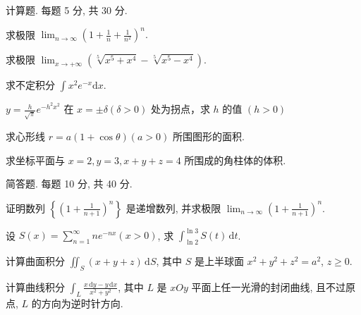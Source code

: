 \par{}
计算题. 每题 5 分, 共 30 分.\par
求极限 $\lim_{n\to \infty}\left(1 + \frac{1}{n} +\frac{1}{n^2}\right)^n.$\par
求极限 $\lim_{x\to +\infty}\left(\sqrt[5]{x^5 + x^4} -\sqrt[5]{x^5 - x^4}\right).$\par
求不定积分 $\int x^{2}e^{-x}\mathrm{d}x.$\par
$y = \frac{h}{\sqrt{\pi}} e^{-h^2 x^2}$ 在 $x = \pm \delta (\delta >0)$ 处为拐点，求 $h$ 的值 $(h > 0)$\par
求心形线 $r = a(1 + \cos \theta) (a > 0)$ 所围图形的面积.\par
求坐标平面与 $x = 2, y = 3, x + y + z = 4$ 所围成的角柱体的体积.\par
\par{}
简答题. 每题 10 分, 共 40 分.\par
证明数列 $\left\{\left(1 + \frac{1}{n + 1}\right)^n\right\}$ 是递增数列, 并求极限 $\lim_{n\to \infty}\left(1 + \frac{1}{n + 1}\right)^n.$\par
设 $S(x) = \sum_{n=1}^{\infty} ne^{-nx} (x > 0)$, 求 $\int_{\ln 2}^{\ln 3} S(t) \, \mathrm{d}t$.\par
计算曲面积分 $\iint_{S} (x + y + z) \, \mathrm{d}S$, 其中 $S$ 是上半球面 $x^{2} + y^{2} + z^{2} = a^{2}$, $z \geq 0$.\par
计算曲线积分 $\int_{L} \frac{x \, \mathrm{d}y - y \, \mathrm{d}x}{x^2 + y^2}$, 其中 $L$ 是 $xOy$ 平面上任一光滑的封闭曲线, 且不过原点, $L$ 的方向为逆时针方向.\par
